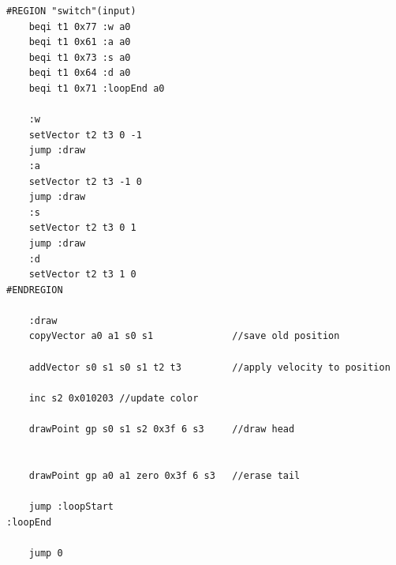 \documentclass[
	12pt,				%
	openright,			%
	oneside,			%
	a4paper,			%
	english,			%
	french,				%
	spanish,			%
	brazil,				%
	]{abntex2}
\begin{document}
\begin{lstlisting}
#REGION "switch"(input)
	beqi t1 0x77 :w a0
	beqi t1 0x61 :a a0
	beqi t1 0x73 :s a0
	beqi t1 0x64 :d a0
	beqi t1 0x71 :loopEnd a0

	:w
	setVector t2 t3 0 -1
	jump :draw
	:a
	setVector t2 t3 -1 0
	jump :draw
	:s
	setVector t2 t3 0 1
	jump :draw
	:d
	setVector t2 t3 1 0
#ENDREGION
	
	:draw
	copyVector a0 a1 s0 s1				//save old position
	
	addVector s0 s1 s0 s1 t2 t3			//apply velocity to position
	
	inc s2 0x010203	//update color
	
	drawPoint gp s0 s1 s2 0x3f 6 s3		//draw head
	
	
	drawPoint gp a0 a1 zero 0x3f 6 s3	//erase tail

	jump :loopStart
:loopEnd
	
	jump 0
\end{lstlisting}



\begin{anexosenv}

\partanexos

\end{anexosenv}



\end{document}
